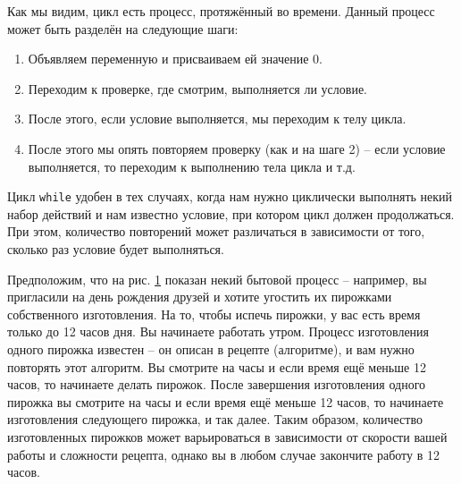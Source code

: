 \documentclass[../sparc.tex]{subfiles}
\begin{document}
\begin{figure}[ht]
  \centering
  \label{fig:control-flow-while-loop}
\end{figure}

Как мы видим, цикл есть процесс, протяжённый во времени. Данный процесс может
быть разделён на следующие шаги:

\begin{enumerate}
\item Объявляем переменную и присваиваем ей значение 0.
\item Переходим к проверке, где смотрим, выполняется ли условие.
\item После этого, если условие выполняется, мы переходим к телу цикла.
\item После этого мы опять повторяем проверку (как и на шаге 2) -- если условие
  выполняется, то переходим к выполнению тела цикла и т.д.
\end{enumerate}

Цикл \texttt{while} удобен в тех случаях, когда нам нужно циклически выполнять
некий набор действий и нам известно условие, при котором цикл должен
продолжаться.  При этом, количество повторений может различаться в зависимости
от того, сколько раз условие будет выполняться.

Предположим, что на рис. \ref{fig:control-flow-while-loop} показан некий бытовой
процесс -- например, вы пригласили на день рождения друзей и хотите угостить их
пирожками собственного изготовления.  На то, чтобы испечь пирожки, у вас есть
время только до 12 часов дня.  Вы начинаете работать утром.  Процесс
изготовления одного пирожка известен -- он описан в рецепте (алгоритме), и вам
нужно повторять этот алгоритм.  Вы смотрите на часы и если время ещё меньше 12
часов, то начинаете делать пирожок.  После завершения изготовления одного
пирожка вы смотрите на часы и если время ещё меньше 12 часов, то начинаете
изготовления следующего пирожка, и так далее.  Таким образом, количество
изготовленных пирожков может варьироваться в зависимости от скорости вашей
работы и сложности рецепта, однако вы в любом случае закончите работу в 12
часов.
\end{document}
